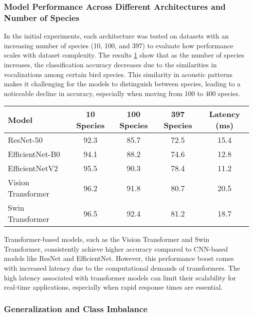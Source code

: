 \subsubsection{Model Performance Across Different Architectures and Number of Species}

In the initial experiments, each architecture was tested on datasets with an increasing number of species (10, 100, and 397) to evaluate how performance scales with dataset complexity. The results \ref{tab:model_performance} show that as the number of species increases, the classification accuracy decreases due to the similarities in vocalizations among certain bird species. This similarity in acoustic patterns makes it challenging for the models to distinguish between species, leading to a noticeable decline in accuracy, especially when moving from 100 to 400 species.

\caption{Model Performance Across Different Species and Latency (ms)}
\begin{table}
\begin{tabular}{|l|c|c|c|c|}
\hline
\textbf{Model} & \textbf{10 Species} & \textbf{100 Species} & \textbf{397 Species} & \textbf{Latency (ms)} \\
\hline
ResNet-50       & 92.3 & 85.7 & 72.5 & 15.4 \\
EfficientNet-B0 & 94.1 & 88.2 & 74.6 & 12.8 \\
EfficientNetV2  & 95.5 & 90.3 & 78.4 & 11.2 \\
Vision Transformer & 96.2 & 91.8 & 80.7 & 20.5 \\
Swin Transformer   & 96.5 & 92.4 & 81.2 & 18.7 \\
\hline
\end{tabular}
\label{tab:model_performance}
\end{table}

Transformer-based models, such as the Vision Transformer and Swin Transformer, consistently achieve higher accuracy compared to CNN-based models like ResNet and EfficientNet. However, this performance boost comes with increased latency due to the computational demands of transformers. The high latency associated with transformer models can limit their scalability for real-time applications, especially when rapid response times are essential.

\subsubsection{Generalization and Class Imbalance}

